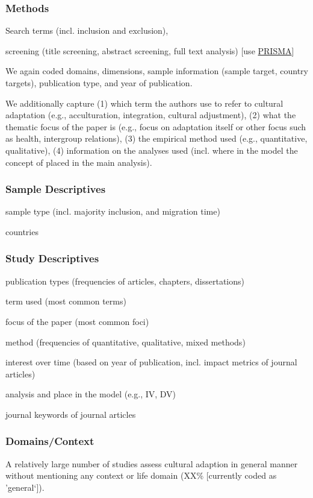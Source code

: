 \documentclass[man, 12pt, a4paper]{apa7}
\begin{document}
\subsubsection{Methods}
Search terms (incl. inclusion and exclusion),

screening (title screening, abstract screening, full text analysis) [use \href{http://prisma-statement.org/PRISMAStatement/FlowDiagram}{PRISMA}]

We again coded domains, dimensions, sample information (sample target, country targets), publication type, and year of publication.

We additionally capture (1) which term the authors use to refer to cultural adaptation (e.g., acculturation, integration, cultural adjustment), (2) what the thematic focus of the paper is (e.g., focus on adaptation itself or other focus such as health, intergroup relations), (3) the empirical method used (e.g., quantitative, qualitative), (4) information on the analyses used (incl. where in the model the concept of placed in the main analysis).
\subsubsection{Sample Descriptives}
sample type (incl. majority inclusion, and migration time)

countries
\subsubsection{Study Descriptives}
publication types (frequencies of articles, chapters, dissertations)

term used (most common terms)

focus of the paper (most common foci)

method (frequencies of quantitative, qualitative, mixed methods)

interest over time (based on year of publication, incl. impact metrics of journal articles)

analysis and place in the model (e.g., IV, DV)

journal keywords of journal articles
\subsubsection{Domains/Context}
A relatively large number of studies assess cultural adaption in general manner without mentioning any context or life domain (XX\% [currently coded as 'general‘]).
\end{document}
